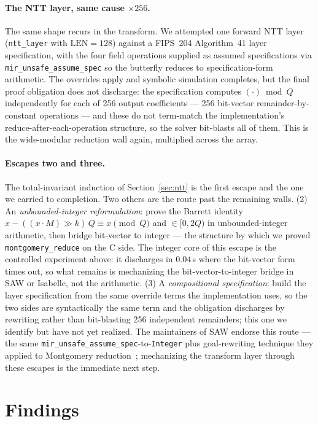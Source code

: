 \documentclass[11pt]{article}
\newcommand{\code}[1]{\texttt{#1}}
\begin{document}
\paragraph{The NTT layer, same cause $\times 256$.} The same shape recurs in the transform. We attempted
one forward NTT layer (\code{ntt\_layer} with $\mathrm{LEN}=128$) against a FIPS~204 Algorithm~41 layer
specification, with the four field operations supplied as assumed specifications via
\code{mir\_unsafe\_assume\_spec} so the butterfly reduces to specification-form arithmetic. The overrides
apply and symbolic simulation completes, but the final proof obligation does not discharge: the
specification computes $(\cdot) \bmod Q$ independently for each of 256 output coefficients ---
256 bit-vector remainder-by-constant operations --- and these do not term-match the implementation's
reduce-after-each-operation structure, so the solver bit-blasts all of them. This is the wide-modular
reduction wall again, multiplied across the array.

\paragraph{Escapes two and three.} The total-invariant induction of Section~\ref{sec:ntt} is the first
escape and the one we carried to completion. Two others are the route past the remaining walls.
(2) An \emph{unbounded-integer reformulation}: prove the Barrett identity
$x - ((x \cdot M)\gg k)\,Q \equiv x \pmod Q$ and $\in [0, 2Q)$ in unbounded-integer arithmetic, then
bridge bit-vector to integer --- the structure by which we proved \code{montgomery\_reduce} on the C side.
The integer core of this escape is the controlled experiment above: it discharges in $0.04$\,s where the
bit-vector form times out, so what remains is mechanizing the bit-vector-to-integer bridge in SAW or
Isabelle, not the arithmetic. (3) A \emph{compositional specification}: build the layer specification from
the same override terms the implementation uses, so the two sides are syntactically the same term and the
obligation discharges by rewriting rather than bit-blasting 256 independent remainders; this one we
identify but have not yet realized. The maintainers of SAW endorse this route --- the same
\code{mir\_unsafe\_assume\_spec}-to-\code{Integer} plus goal-rewriting technique they applied to
Montgomery reduction~\cite{saw3306}; mechanizing the transform layer through these escapes is the
immediate next step.

\section{Findings}\label{sec:findings}
\end{document}
